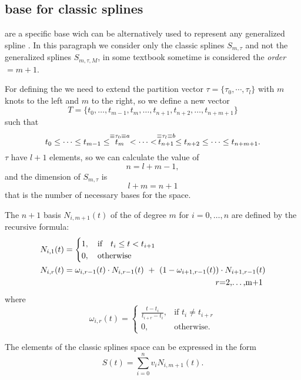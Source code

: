 \documentclass[dissertation.tex]{subfiles}
\begin{document}
\subsection{\bss base for classic
  splines}\label{sec:bsplines}\index{\bss}
\emph{\bss} are a specific base wich can be alternatively used to
represent any generalized spline \cite{deboor}\cite{farin}. In this
paragraph we consider only the classic splines $S_{m,\tau}$ and not
the generalized splines $S_{m,\tau,M}$, in some textbook sometime is
considered the
\emph{order}$=m+1$.

For defining the \bss we need to extend the partition vector
$\tau=\{\tau_0,\cdots,\tau_l\}$ with $m$ knots to the left and $m$ to
the right, so we define a new vector
$$
T=\{t_0,\dots,t_{m-1},t_{m},\dots,t_{n+1},t_{n+2},\dots,t_{n+m+1}\}
$$
such that
\begin{equation*}
  t_0\leq\dots\leq t_{m-1}\leq \stackrel{\equiv\tau_0\equiv a}{t_{m}}<\dots<\stackrel{\equiv\tau_l\equiv b}{t_{n+1}}\leq t_{n+2}\leq\dots\leq t_{n+m+1}.    
\end{equation*}
$\tau$ have $l+1$ elements, so we can calculate the value of
$$
n=l+m-1,
$$
and the dimension of $S_{m,\tau}$ is
$$
l+m=n+1
$$
that is the number of necessary bases for the space.

The $n+1$ basis $N_{i,m+1}(t)$ of the \bss of degree $m$ for
$i=0,\dots,n$ are defined by the 
recursive formula:
\begin{align*}
  N_{i,1}(t) &=
  \begin{cases}
    1,\quad \mbox{if}\quad t_i\leq t<t_{i+1}\\
    0,\quad \mbox{otherwise}
  \end{cases}\\
  N_{i,r}(t) &= \omega_{i,r-1}(t)\cdot N_{i,r-1}(t)\ +\
  (1-\omega_{i+1,r-1}(t))\cdot N_{i+1,r-1}(t)\\
             &\pushright r=2,\dots,m+1
\end{align*}
where
$$
\omega_{i,r}(t) = \begin{cases}
  \frac{t-t_i}{t_{i+r}-t_i},&\mbox{if }t_i\neq t_{i+r}\\
  0, &\mbox{otherwise.}
\end{cases}
$$

The elements of the classic splines space can be expressed in the form
\begin{equation}\label{eq:bsplineElement}
  S(t)=\sum_{i=0}^nv_i N_{i,m+1}(t).
\end{equation}
\end{document}
